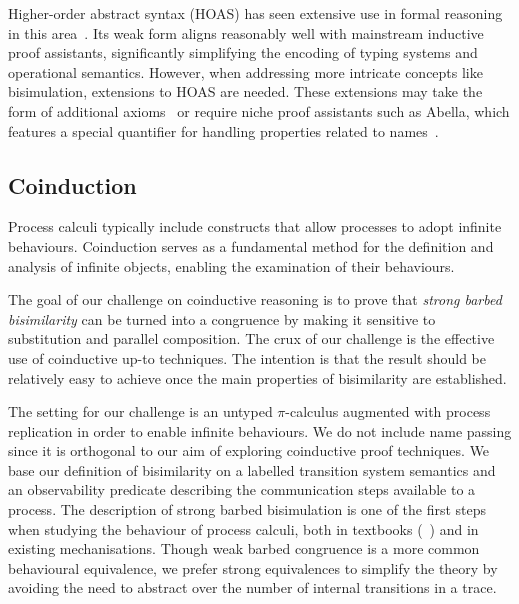 \documentclass[runningheads]{llncs}
\begin{document}
Higher-order abstract syntax (HOAS) has seen extensive
use in formal reasoning in this area~\cite{Despeyroux2000,Honsell2001,Tiu2010,ChaudhuriCM15,Castro-Perez2021}. Its
weak form aligns reasonably well with mainstream inductive proof assistants,
significantly simplifying the encoding of typing systems and operational
semantics. However, when addressing more intricate concepts like
bisimulation, extensions to HOAS are needed. These extensions may take
the form of additional axioms~\cite{Honsell2001} or require niche proof assistants
such as Abella, which features a special quantifier for handling
properties related to names~\cite{GacekMN11}.

\subsection{Coinduction}

Process calculi typically include constructs that allow processes to
adopt infinite behaviours.  Coinduction serves as a fundamental method
for the definition and analysis of infinite objects, enabling the
examination of their behaviours.

The goal of our challenge on coinductive reasoning is to prove that
\emph{strong barbed bisimilarity} can be turned into a congruence by
making it sensitive to substitution and parallel composition. The crux
of our challenge is the effective use of coinductive up-to techniques.
The intention is that the result should be relatively easy to
achieve once the main properties of bisimilarity are established.

The setting for our challenge is an untyped \(\pi\)-calculus augmented
with process replication in order to enable infinite behaviours.  We
do not include name passing since it is orthogonal to our aim of
exploring coinductive proof techniques.  We base our definition of
bisimilarity on a labelled transition system semantics and an
observability predicate describing the communication steps available
to a process.  The description of strong barbed bisimulation is one of
the first steps when studying the behaviour of process calculi, both
in textbooks (\eg~\cite{picalcbook}) and in existing mechanisations.
Though weak barbed congruence is a more common behavioural
equivalence, we prefer strong equivalences to simplify the theory by
avoiding the need to abstract over the number of internal transitions
in a trace.
\end{document}
